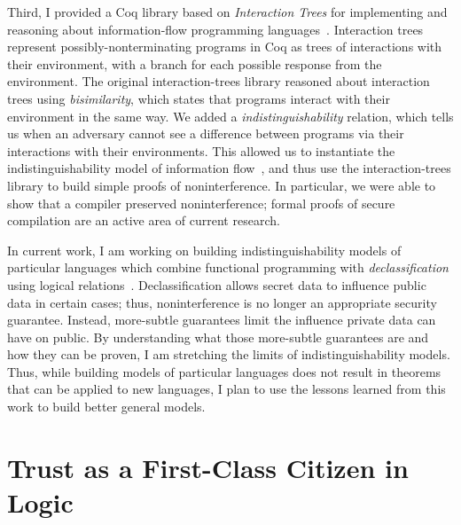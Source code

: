 \documentclass{article}
\theoremstyle{definition}
\begin{document}
Third, I provided a Coq library based on \emph{Interaction Trees} for implementing and reasoning about information-flow programming languages~\citep{SilverHHCZ22}.
Interaction trees represent possibly-nonterminating programs in Coq as trees of interactions with their environment, with a branch for each possible response from the environment.
The original interaction-trees library reasoned about interaction trees using \emph{bisimilarity}, which states that programs interact with their environment in the same way.
We added a \emph{indistinguishability} relation, which tells us when an adversary cannot see a difference between programs via their interactions with their environments.
This allowed us to instantiate the indistinguishability model of information flow~\citep{SabelfeldS99}, and thus use the interaction-trees library to build simple proofs of noninterference.
In particular, we were able to show that a compiler preserved noninterference; formal proofs of secure compilation are an active area of current research.

In current work, I am working on building indistinguishability models of particular languages which combine functional programming with \emph{declassification} using logical relations~\citep{MenzHLG22}.
Declassification allows secret data to influence public data in certain cases; thus, noninterference is no longer an appropriate security guarantee.
Instead, more-subtle guarantees limit the influence private data can have on public.
By understanding what those more-subtle guarantees are and how they can be proven, I am stretching the limits of indistinguishability models.
Thus, while building models of particular languages does not result in theorems that can be applied to new languages, I plan to use the lessons learned from this work to build better general models.

\section*{Trust as a First-Class Citizen in Logic}
\end{document}
